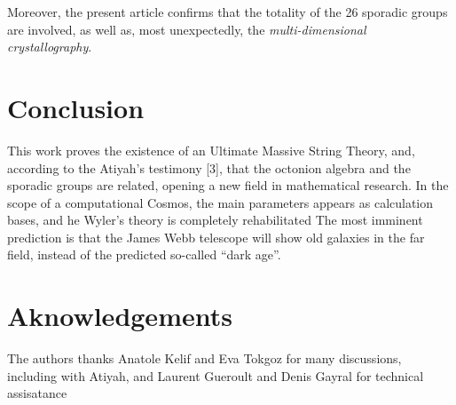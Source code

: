 \documentclass[preprint,12pt]{elsarticle}
\begin{document}
     Moreover, the present article confirms that the totality of the 26 sporadic groups are involved, as well as, most unexpectedly, the \textit{multi-dimensional crystallography}. 




\section{Conclusion}

This work proves the existence of an Ultimate Massive String Theory, and, according to the Atiyah's testimony [3], that the octonion algebra and the sporadic groups are related, opening a new field in mathematical research. In the scope of a computational Cosmos, the main parameters appears as calculation bases, and he Wyler's theory is completely rehabilitated  The most imminent prediction is that the James Webb telescope will show old galaxies in the far field, instead of the predicted so-called ``dark age''.

\section {Aknowledgements}

The authors thanks Anatole Kelif and Eva Tokgoz for many discussions, including with Atiyah, and Laurent Gueroult and Denis Gayral for technical assisatance
\end{document}
